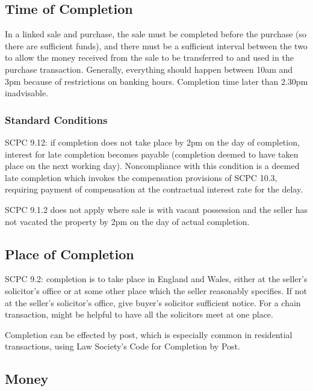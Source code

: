 \documentclass[
]{article}
\begin{document}
\hypertarget{time-of-completion}{%
\subsection{Time of Completion}\label{time-of-completion}}

In a linked sale and purchase, the sale must be completed before the
purchase (so there are sufficient funds), and there must be a sufficient
interval between the two to allow the money received from the sale to be
transferred to and used in the purchase transaction. Generally,
everything should happen between 10am and 3pm because of restrictions on
banking hours. Completion time later than 2.30pm inadvisable.

\hypertarget{standard-conditions-1}{%
\subsubsection{Standard Conditions}\label{standard-conditions-1}}

SCPC 9.12: if completion does not take place by 2pm on the day of
completion, interest for late completion becomes payable (completion
deemed to have taken place on the next working day). Noncompliance with
this condition is a deemed late completion which invokes the
compensation provisions of SCPC 10.3, requiring payment of compensation
at the contractual interest rate for the delay.

SCPC 9.1.2 does not apply where sale is with vacant possession and the
seller has not vacated the property by 2pm on the day of actual
completion.

\hypertarget{place-of-completion}{%
\subsection{Place of Completion}\label{place-of-completion}}

SCPC 9.2: completion is to take place in England and Wales, either at
the seller's solicitor's office or at some other place which the seller
reasonably specifies. If not at the seller's solicitor's office, give
buyer's solicitor sufficient notice. For a chain transaction, might be
helpful to have all the solicitors meet at one place.

Completion can be effected by post, which is especially common in
residential transactions, using Law Society's Code for Completion by
Post.

\hypertarget{money}{%
\subsection{Money}\label{money}}
\end{document}
